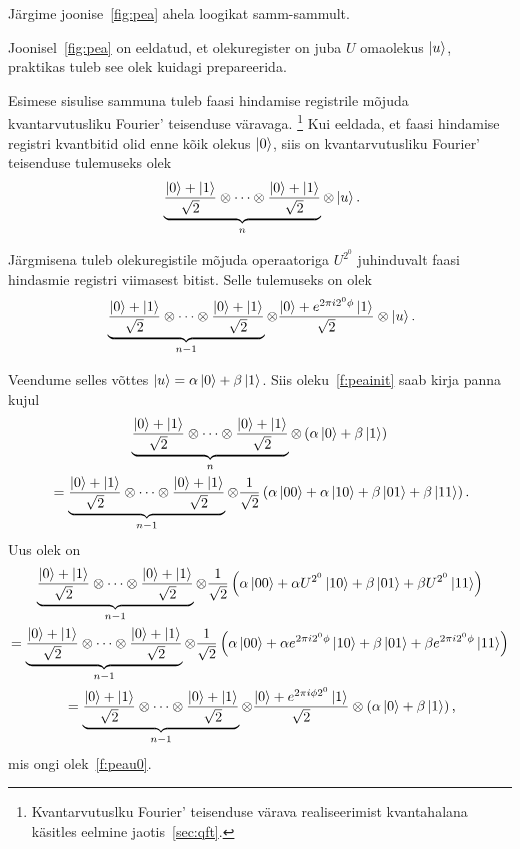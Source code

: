\documentclass[12pt]{report}
\def\paren#1{\left(#1\right)}
\def\ket#1{\mathinner{|#1\rangle}}
\begin{document}
Järgime joonise~\ref{fig:pea} ahela loogikat samm-sammult.

Joonisel~\ref{fig:pea} on eeldatud, et olekuregister on juba \(U\) omaolekus \(\ket{u}\), praktikas tuleb see olek kuidagi prepareerida.

Esimese sisulise sammuna tuleb faasi hindamise registrile mõjuda kvantarvutusliku Fourier' teisenduse väravaga.%
\footnote{Kvantarvutuslku Fourier' teisenduse värava realiseerimist kvantahalana käsitles eelmine jaotis~\ref{sec:qft}.}
Kui eeldada, et faasi hindamise registri kvantbitid olid enne kõik olekus \(\ket{0}\), siis on kvantarvutusliku Fourier' teisenduse tulemuseks olek
\begin{align}\label{f:peainit}
    \underbrace{\frac{\ket{0}+\ket{1}}{\sqrt{2}}
    \otimes \cdots
    \otimes \frac{\ket{0}+\ket{1}}{\sqrt{2}}}_n
    \otimes \ket{u} \rlap{.}
\end{align}

Järgmisena tuleb olekuregistile mõjuda operaatoriga \(U^{2^0}\) juhinduvalt faasi hindasmie registri viimasest bitist.
Selle tulemuseks on olek
\begin{align}\label{f:peau0}
    \underbrace{\frac{\ket{0}+\ket{1}}{\sqrt{2}}
    \otimes \cdots
    \otimes \frac{\ket{0}+\ket{1}}{\sqrt{2}}}_{n - 1}
    \otimes \frac{\ket{0}+e^{2\pi i2^0\phi}\ket{1}}{\sqrt{2}}
    \otimes \ket{u} \rlap{.}
\end{align}

Veendume selles võttes \(\ket{u} = \alpha\ket{0} + \beta\ket{1}\).
Siis oleku~\ref{f:peainit} saab kirja panna kujul
\begin{multline}
    \underbrace{\frac{\ket{0}+\ket{1}}{\sqrt{2}}
    \otimes \cdots
    \otimes \frac{\ket{0}+\ket{1}}{\sqrt{2}}}_n
    \otimes \paren{\alpha \ket{0} + \beta \ket{1}} \\
    = \underbrace{\frac{\ket{0}+\ket{1}}{\sqrt{2}}
    \otimes \cdots
    \otimes \frac{\ket{0}+\ket{1}}{\sqrt{2}}}_{n - 1}
    \otimes \frac{1}{\sqrt{2}} \paren{
        \alpha \ket{00} + \alpha \ket{10}
        + \beta \ket{01} + \beta \ket{11}
    } \rlap{.}
\end{multline}
Uus olek on
\begin{multline}
    \underbrace{\frac{\ket{0}+\ket{1}}{\sqrt{2}}
    \otimes \cdots
    \otimes \frac{\ket{0}+\ket{1}}{\sqrt{2}}}_{n - 1}
    \otimes \frac{1}{\sqrt{2}} \paren{
        \alpha \ket{00} + \alpha U^{2^0} \ket{10}
        + \beta \ket{01} + \beta U^{2^0} \ket{11}
    } \\
    = \underbrace{\frac{\ket{0}+\ket{1}}{\sqrt{2}}
    \otimes \cdots
    \otimes \frac{\ket{0}+\ket{1}}{\sqrt{2}}}_{n - 1}
    \otimes \frac{1}{\sqrt{2}} \paren{
        \alpha \ket{00} + \alpha e^{2\pi i2^0\phi} \ket{10}
        + \beta \ket{01} + \beta e^{2\pi i2^0\phi} \ket{11}
    } \\
    = \underbrace{\frac{\ket{0}+\ket{1}}{\sqrt{2}}
    \otimes \cdots
    \otimes \frac{\ket{0}+\ket{1}}{\sqrt{2}}}_{n - 1}
    \otimes \frac{\ket{0} + e^{2\pi i\phi 2^0} \ket{1}}{\sqrt{2}}
    \otimes \paren{\alpha \ket{0} + \beta \ket{1}} \rlap{,}
\end{multline}
mis ongi olek~\ref{f:peau0}.
\end{document}
